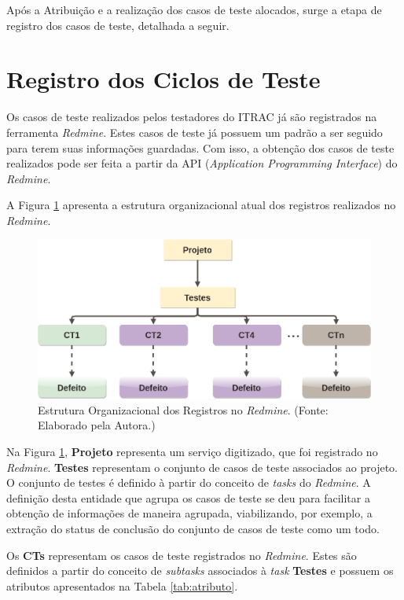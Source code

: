 Após a Atribuição e a realização dos casos de teste alocados, surge a etapa de registro dos casos de teste, detalhada a seguir.

\section{Registro dos Ciclos de Teste}

Os casos de teste realizados pelos testadores do ITRAC já são registrados na ferramenta \textit{Redmine}. Estes casos de teste já possuem um padrão a ser seguido para terem suas informações guardadas. Com isso, a obtenção dos casos de teste realizados pode ser feita a partir da API (\textit{Application Programming Interface}) do \textit{Redmine}.

A Figura \ref{fig:registro} apresenta a estrutura organizacional atual dos registros realizados no \textit{Redmine}.


        \begin{figure}[h]
          \centering
          \includegraphics[width=15cm]{figuras/registro.png}
          \caption{Estrutura Organizacional dos Registros no \textit{Redmine}. (Fonte: Elaborado pela Autora.)}
          \label{fig:registro}

        \end{figure}

Na Figura \ref{fig:registro}, \textbf{Projeto} representa um serviço digitizado, que foi registrado no \textit{Redmine}. \textbf{Testes} representam o conjunto de casos de teste associados ao projeto. O conjunto de testes é definido à partir do conceito de \textit{tasks} do \textit{Redmine}. A definição desta entidade que agrupa os casos de teste se deu para facilitar a obtenção de informações de maneira agrupada, viabilizando, por exemplo, a extração do status de conclusão do conjunto de casos de teste como um todo.

Os \textbf{CTs} representam os casos de teste registrados no \textit{Redmine}. Estes são definidos a partir do conceito de \textit{subtasks} associados à \textit{task} \textbf{Testes} e possuem os atributos apresentados na Tabela \ref{tab:atributo}.

